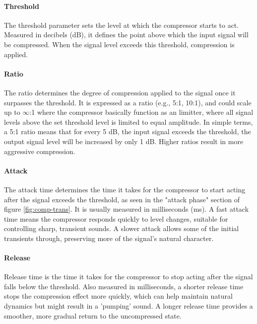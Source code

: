 \documentclass[10pt]{article}
\begin{document}
\begin{multicols*}{2}
            \paragraph{Threshold}
                The threshold parameter sets the level at which the compressor starts to act. Measured in decibels (dB), it defines the point above which the input signal will be compressed. When the signal level exceeds this threshold, compression is applied.

            \paragraph{Ratio}
                The ratio determines the degree of compression applied to the signal once it surpasses the threshold. It is expressed as a ratio (e.g., 5:1, 10:1), and could scale up to $\infty$:1 where the compressor basically function as an limitter, where all signal levels above the set threshold level is limited to equal amplitude. In simple terms, a 5:1 ratio means that for every 5 dB, the input signal exceeds the threshold, the output signal level will be increased by only 1 dB. Higher ratios result in more aggressive compression.

            \paragraph{Attack}
                The attack time determines the time it takes for the compressor to start acting after the signal exceeds the threshold, as seen in the "attack phase" section of figure \ref{fig:comp-trans}. It is usually measured in milliseconds (ms). A fast attack time means the compressor responds quickly to level changes, suitable for controlling sharp, transient sounds. A slower attack allows some of the initial transients through, preserving more of the signal's natural character.

            \paragraph{Release}
                Release time is the time it takes for the compressor to stop acting after the signal falls below the threshold. Also measured in milliseconds, a shorter release time stops the compression effect more quickly, which can help maintain natural dynamics but might result in a 'pumping' sound. A longer release time provides a smoother, more gradual return to the uncompressed state.
            

\end{multicols*}
\end{document}
